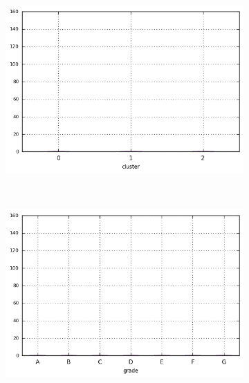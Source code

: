 \begin{anexosenv}
\begin{figure}[t!]
\begin{subfigure}[t]{0.45\textwidth}
            \centerline{\includegraphics[width=1\textwidth]{img/total_rec_late_fee_by_cluster}}
        \end{subfigure}%
        ~ 
        \begin{subfigure}[t]{0.45\textwidth}
            \centering
   
            \centerline{\includegraphics[width=1\textwidth]{img/total_rec_late_fee_by_grade}}

        \end{subfigure}
                \\
                \caption{\emph{Boxplots} de dti}
        \begin{subfigure}[t]{0.45\textwidth}
            \centering


\end{subfigure}
\end{figure}
\end{anexosenv}
